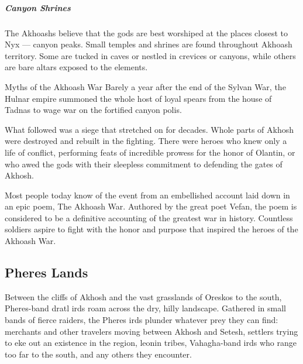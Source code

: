         \subparagraph{Canyon Shrines} The Akhoashs believe that the gods are best worshiped at the places closest to Nyx --- canyon peaks.
        Small temples and shrines are found throughout Akhoash territory.
        Some are tucked in caves or nestled in crevices or canyons, while others are bare altars exposed to the elements.

    \begin{DndComment}{Myths of the Akhoash War}
        Barely a year after the end of the Sylvan War, the Hulnar empire summoned the whole host of loyal spears from the house of Tadnas to wage war on the fortified canyon polis.

        What followed was a siege that stretched on for decades.
        Whole parts of Akhosh were destroyed and rebuilt in the fighting.
        There were heroes who knew only a life of conflict, performing feats of incredible prowess for the honor of Olantin, or who awed the gods with their sleepless commitment to defending the gates of Akhosh.

        Most people today know of the event from an embellished account laid down in an epic poem, The Akhoash War.
        Authored by the great poet Vefan, the poem is considered to be a definitive accounting of the greatest war in history.
        Countless soldiers aspire to fight with the honor and purpose that inspired the heroes of the Akhoash War.
    \end{DndComment}

\subsection*{Pheres Lands}
    Between the cliffs of Akhosh and the vast grasslands of Oreskos to the south, Pheres-band dratl irds roam across the dry, hilly landscape.
    Gathered in small bands of fierce raiders, the Pheres irds plunder whatever prey they can find: merchants and other travelers moving between Akhosh and Setesh, settlers trying to eke out an existence in the region, leonin tribes, Vahagha-band irds who range too far to the south, and any others they encounter.
